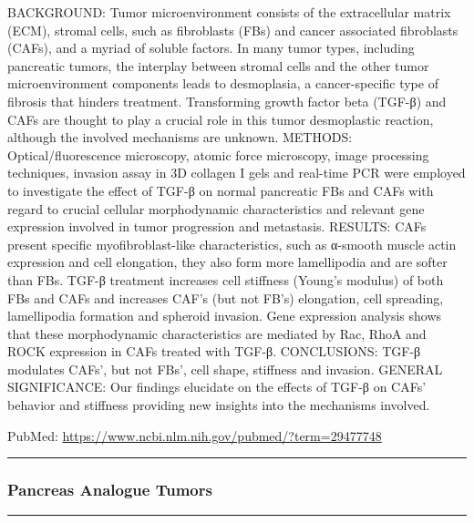 \documentclass[]{article}
\begin{document}
BACKGROUND: Tumor microenvironment consists of the extracellular matrix
(ECM), stromal cells, such as fibroblasts (FBs) and cancer associated
fibroblasts (CAFs), and a myriad of soluble factors. In many tumor
types, including pancreatic tumors, the interplay between stromal cells
and the other tumor microenvironment components leads to desmoplasia, a
cancer-specific type of fibrosis that hinders treatment. Transforming
growth factor beta (TGF-β) and CAFs are thought to play a crucial role
in this tumor desmoplastic reaction, although the involved mechanisms
are unknown. METHODS: Optical/fluorescence microscopy, atomic force
microscopy, image processing techniques, invasion assay in 3D collagen I
gels and real-time PCR were employed to investigate the effect of TGF-β
on normal pancreatic FBs and CAFs with regard to crucial cellular
morphodynamic characteristics and relevant gene expression involved in
tumor progression and metastasis. RESULTS: CAFs present specific
myofibroblast-like characteristics, such as α-smooth muscle actin
expression and cell elongation, they also form more lamellipodia and are
softer than FBs. TGF-β treatment increases cell stiffness (Young's
modulus) of both FBs and CAFs and increases CAF's (but not FB's)
elongation, cell spreading, lamellipodia formation and spheroid
invasion. Gene expression analysis shows that these morphodynamic
characteristics are mediated by Rac, RhoA and ROCK expression in CAFs
treated with TGF-β. CONCLUSIONS: TGF-β modulates CAFs', but not FBs',
cell shape, stiffness and invasion. GENERAL SIGNIFICANCE: Our findings
elucidate on the effects of TGF-β on CAFs' behavior and stiffness
providing new insights into the mechanisms involved.

PubMed: \url{https://www.ncbi.nlm.nih.gov/pubmed/?term=29477748}

{}

{}

\begin{center}\rule{0.5\linewidth}{\linethickness}\end{center}

\hypertarget{pancreas-analogue-tumors}{%
\subsubsection{Pancreas Analogue
Tumors}\label{pancreas-analogue-tumors}}

\begin{center}\rule{0.5\linewidth}{\linethickness}\end{center}
\end{document}
